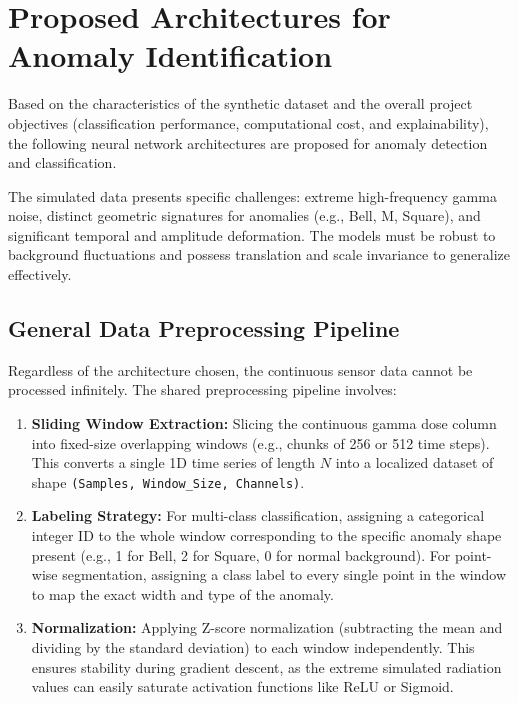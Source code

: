 \section{Proposed Architectures for Anomaly Identification}

Based on the characteristics of the synthetic dataset and the overall project objectives (classification performance, computational cost, and explainability), the following neural network architectures are proposed for anomaly detection and classification. 

The simulated data presents specific challenges: extreme high-frequency gamma noise, distinct geometric signatures for anomalies (e.g., Bell, M, Square), and significant temporal and amplitude deformation. The models must be robust to background fluctuations and possess translation and scale invariance to generalize effectively.

\subsection{General Data Preprocessing Pipeline}
Regardless of the architecture chosen, the continuous sensor data cannot be processed infinitely. The shared preprocessing pipeline involves:
\begin{enumerate}
    \item \textbf{Sliding Window Extraction:} Slicing the continuous gamma dose column into fixed-size overlapping windows (e.g., chunks of 256 or 512 time steps). This converts a single 1D time series of length $N$ into a localized dataset of shape \texttt{(Samples, Window\_Size, Channels)}.
    \item \textbf{Labeling Strategy:} For multi-class classification, assigning a categorical integer ID to the whole window corresponding to the specific anomaly shape present (e.g., 1 for Bell, 2 for Square, 0 for normal background). For point-wise segmentation, assigning a class label to every single point in the window to map the exact width and type of the anomaly.
    \item \textbf{Normalization:} Applying Z-score normalization (subtracting the mean and dividing by the standard deviation) to each window independently. This ensures stability during gradient descent, as the extreme simulated radiation values can easily saturate activation functions like ReLU or Sigmoid.
\end{enumerate}

